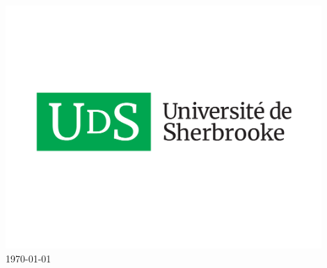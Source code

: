 \begin{titlepage}
\includegraphics[width=0.9\textwidth]{fig/udes.pdf}\\[1cm] 


{\large \iftoggle{EN}{%
Last updated on
}{%
Dernière mise à jour le} \today}\\[1.5cm] 


\vfill %

\end{titlepage}







